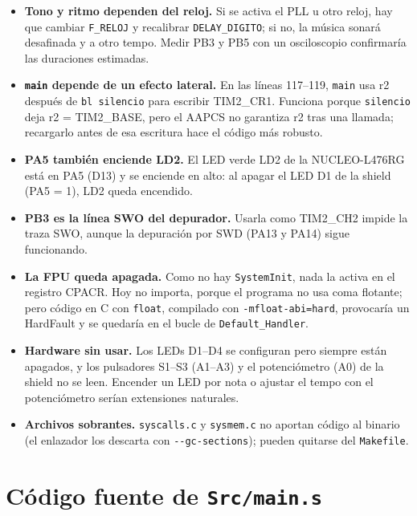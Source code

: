 \documentclass[11pt,letterpaper]{article}
\begin{document}
\begin{itemize}
  \item \textbf{Tono y ritmo dependen del reloj.} Si se activa el PLL u otro reloj, hay que cambiar
        \texttt{F\_RELOJ} y recalibrar \texttt{DELAY\_DIGITO}; si no, la música sonará desafinada y a otro
        tempo. Medir PB3 y PB5 con un osciloscopio confirmaría las duraciones estimadas.
  \item \textbf{\texttt{main} depende de un efecto lateral.} En las líneas 117--119, \texttt{main} usa r2
        después de \texttt{bl silencio} para escribir TIM2\_CR1. Funciona porque \texttt{silencio} deja
        r2 = TIM2\_BASE, pero el AAPCS no garantiza r2 tras una llamada; recargarlo antes de esa escritura
        hace el código más robusto.
  \item \textbf{PA5 también enciende LD2.} El LED verde LD2 de la NUCLEO-L476RG está en PA5 (D13) y se
        enciende en alto: al apagar el LED D1 de la shield (PA5 = 1), LD2 queda encendido.
  \item \textbf{PB3 es la línea SWO del depurador.} Usarla como TIM2\_CH2 impide la traza SWO, aunque la
        depuración por SWD (PA13 y PA14) sigue funcionando.
  \item \textbf{La FPU queda apagada.} Como no hay \texttt{SystemInit}, nada la activa en el registro CPACR.
        Hoy no importa, porque el programa no usa coma flotante; pero código en C con \texttt{float},
        compilado con \texttt{-mfloat-abi=hard}, provocaría un HardFault y se quedaría en el bucle de
        \texttt{Default\_Handler}.
  \item \textbf{Hardware sin usar.} Los LEDs D1--D4 se configuran pero siempre están apagados, y los
        pulsadores S1--S3 (A1--A3) y el potenciómetro (A0) de la shield no se leen. Encender un LED por
        nota o ajustar el tempo con el potenciómetro serían extensiones naturales.
  \item \textbf{Archivos sobrantes.} \texttt{syscalls.c} y \texttt{sysmem.c} no aportan código al binario
        (el enlazador los descarta con \texttt{-{}-gc-sections}); pueden quitarse del \texttt{Makefile}.
\end{itemize}

\appendix
\section{Código fuente de \texttt{Src/main.s}}
\end{document}
